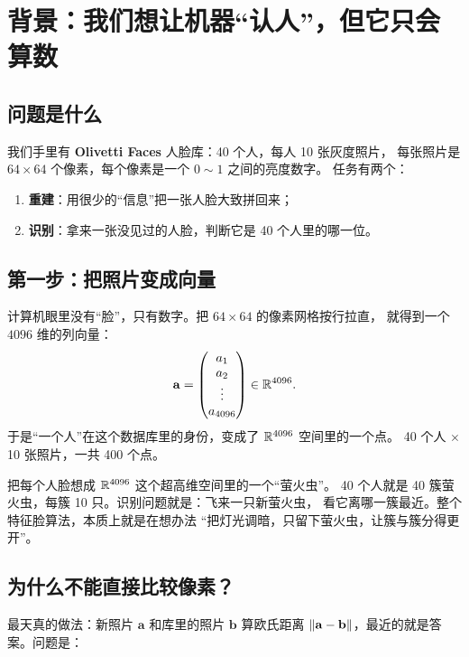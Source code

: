 \section{背景：我们想让机器“认人”，但它只会算数}

\subsection{问题是什么}

我们手里有 \textbf{Olivetti Faces} 人脸库：40 个人，每人 10 张灰度照片，
每张照片是 $64\times 64$ 个像素，每个像素是一个 $0\sim 1$ 之间的亮度数字。
任务有两个：

\begin{enumerate}
  \item \textbf{重建}：用很少的“信息”把一张人脸大致拼回来；
  \item \textbf{识别}：拿来一张没见过的人脸，判断它是 40 个人里的哪一位。
\end{enumerate}

\subsection{第一步：把照片变成向量}

计算机眼里没有“脸”，只有数字。把 $64\times 64$ 的像素网格按行拉直，
就得到一个 $4096$ 维的列向量：
\[
\mathbf{a}=\begin{pmatrix}a_1\\ a_2\\ \vdots\\ a_{4096}\end{pmatrix}\in\mathbb{R}^{4096}.
\]
于是“一个人”在这个数据库里的身份，变成了 $\mathbb{R}^{4096}$ 空间里的一个点。
40 个人 $\times$ 10 张照片，一共 400 个点。

\begin{intuition}
把每个人脸想成 $\mathbb{R}^{4096}$ 这个超高维空间里的一个“萤火虫”。
40 个人就是 40 簇萤火虫，每簇 10 只。识别问题就是：飞来一只新萤火虫，
看它离哪一簇最近。整个特征脸算法，本质上就是在想办法
“把灯光调暗，只留下萤火虫，让簇与簇分得更开”。
\end{intuition}

\subsection{为什么不能直接比较像素？}

最天真的做法：新照片 $\mathbf{a}$ 和库里的照片 $\mathbf{b}$ 算欧氏距离
$\left\lVert \mathbf{a}-\mathbf{b} \right\rVert$，最近的就是答案。问题是：

